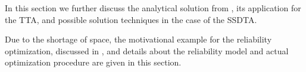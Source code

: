  \label{ap:thermal-circuits}


In this section we further discuss the analytical solution from , its application for the TTA, and possible solution techniques in the case of the SSDTA.



 \label{ap:straight-forward}


 \label{ap:reliability}
Due to the shortage of space, the motivational example for the reliability optimization, discussed in , and details about the reliability model and actual optimization procedure are given in this section.





 \label{ap:genetic-algorithm}

